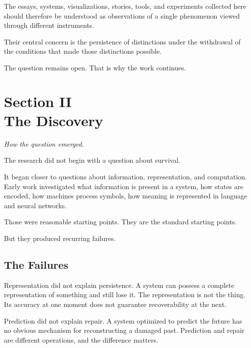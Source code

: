 \documentclass[12pt, openany]{book}
\begin{document}
\bigskip

\noindent The essays, systems, visualizations, stories, tools, and experiments
collected here should therefore be understood as observations of a single
phenomenon viewed through different instruments.

\medskip

\noindent Their central concern is the persistence of distinctions under the
withdrawal of the conditions that made those distinctions possible.

\bigskip\bigskip

\noindent The question remains open. That is why the work continues.

\cleardoublepage

\chapter[The Discovery]{Section II \\ The Discovery}

\noindent\textit{How the question emerged.}

\bigskip

\noindent The research did not begin with a question about survival.

It began closer to questions about information, representation, and
computation. Early work investigated what information is present in a
system, how states are encoded, how machines process symbols, how meaning
is represented in language and neural networks.

Those were reasonable starting points. They are the standard starting points.

But they produced recurring failures.

\section{The Failures}

Representation did not explain persistence. A system can possess a complete
representation of something and still lose it. The representation is not the
thing. Its accuracy at one moment does not guarantee recoverability at the next.

Prediction did not explain repair. A system optimized to predict the future
has no obvious mechanism for reconstructing a damaged past. Prediction and
repair are different operations, and the difference matters.
\end{document}
